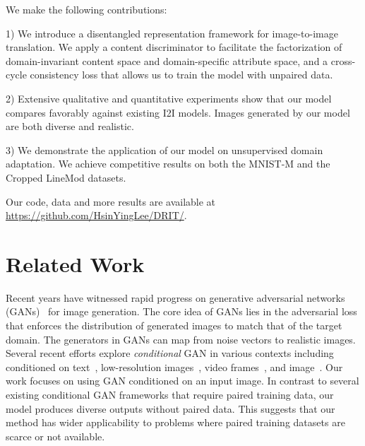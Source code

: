 \documentclass[runningheads]{llncs}
\renewcommand{\jiabin}[1]{}
\begin{document}
We make the following contributions:

1) We introduce a disentangled representation framework for image-to-image translation. 
%
We apply a content discriminator to facilitate the factorization of domain-invariant content space and domain-specific attribute space, and a cross-cycle consistency loss that allows us to train the model with unpaired data.
%
%

2)
Extensive qualitative and quantitative experiments show that our model compares favorably against existing I2I models.
%
Images generated by our model are both diverse and realistic.

%
3)
We demonstrate the application of our model on unsupervised domain adaptation.
%
We achieve competitive results on both the MNIST-M and the Cropped LineMod datasets.
%

Our code, data and more results are available at \url{https://github.com/HsinYingLee/DRIT/}.

\section{Related Work}
\label{sec:related}
\vspace{-1mm}
\vspace{\secmargin}
Recent years have witnessed rapid progress on generative adversarial networks (GANs)~\cite{goodfellow2014GAN,radford2016dcgan,arjovsky2017wgan} for image generation.
%
The core idea of GANs lies in the adversarial loss that enforces the distribution of generated images to match that of the target domain.
% 
The generators in GANs can map from noise vectors to realistic images.
% 
Several recent efforts explore \emph{conditional} GAN in various contexts including conditioned on text~\cite{reed2016text2img}, low-resolution images~\cite{ledig2016photo}, video frames~\cite{vondrick2016videogan}, and image~\cite{isola2017pix2pix}.
% 
Our work focuses on using GAN conditioned on an input image.
%
In contrast to several existing conditional GAN frameworks that require paired training data, our model produces diverse outputs without paired data.
%
This suggests that our method has wider applicability to problems where paired training datasets are scarce or not available.
\end{document}
